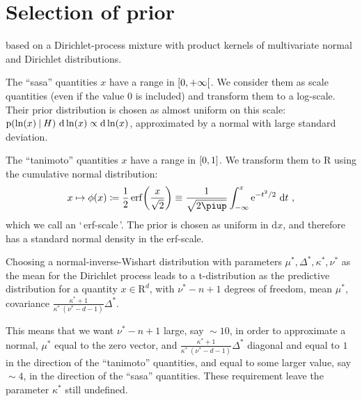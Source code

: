 \documentclass[\ifafour a4paper,12pt,\else a5paper,10pt,\fi%
onecolumn,oneside,article,%
british%
]{memoir}
\newcommand*{\defquote}[1]{`\,#1\,'}
\theoremstyle{remark}
\theoremstyle{innote}
\renewcommand*{\finalnamedelim}{\addspace\amp\space}
\newcommand*{\amp}{\&}
\newcommand*{\pu}{\piup}%
\newcommand*{\e}{\mathrm{e}}%
\newcommand*{\di}{\mathrm{d}}%
\newcommand*{\RR}{\bm{\mathrm{R}}}
\newcommand*{\defd}{\coloneqq}
\DeclarePairedDelimiter\clcl{[}{]}
\DeclarePairedDelimiter\clop{[}{[}
\newcommand*{\p}{\mathrm{p}}%
\renewcommand*{\|}[1][]{\nonscript\:#1\vert\nonscript\:\mathopen{}}
\renewcommand*{\=}{\TextOrMath\texteq\eq}
\begin{document}
\section{Selection of prior}
\label{sec:sel_prior}

based on a Dirichlet-process mixture with
product kernels of multivariate normal and Dirichlet distributions.



The \enquote{sasa} quantities $x$ have a range in $\clop{0,+\infty}$. We
consider them as scale quantities (even if the value $0$ is included) and
transform them to a log-scale. Their prior distribution is chosen as
almost uniform on this scale:
$\p(\ln(x) \| H)\ \di\ln(x) \propto \di\ln(x)$, approximated by a normal
with large standard deviation.

The \enquote{tanimoto} quantities $x$ have a range in $\clcl{0,1}$. We
transform them to $\RR$ using the cumulative normal distribution:
\begin{equation}
  \label{eq:transf_tanimoto}
  x \mapsto \phi(x) \defd
  \frac{1}{2}\operatorname{erf}\biggl(\frac{x}{\sqrt{2}}\biggr)
  \equiv \frac{1}{\sqrt{2\pu}}\int_{-\infty}^{x} \e^{-t^{2}/2}\ \di t \ ,
\end{equation}
which we call an \defquote{erf-scale}.
The prior is chosen as uniform in $\di x$, and therefore has a standard
normal density in the erf-scale.

Choosing a normal-inverse-Wishart distribution with parameters
$\mu^{*}, \varDelta^{*}, \kappa^{*}, \nu^{*}$ as the mean for the Dirichlet
process leads to a t-distribution as the predictive distribution for a
quantity $x \in \RR^{d}$, with $\nu^{*}-n+1$ degrees of freedom, mean
$\mu^{*}$, covariance
$\frac{\kappa^{*}+1}{\kappa^{*}\ (\nu^{*}-d-1)}\varDelta^{*}$.

This means that we want $\nu^{*}-n+1$ large, say ${}\sim 10$, in order to
approximate a normal, $\mu^{*}$ equal to the zero vector, and
$\frac{\kappa^{*}+1}{\kappa^{*}\ (\nu^{*}-d-1)}\varDelta^{*}$ diagonal and
equal to $1$ in the direction of the \enquote{tanimoto} quantities, and
equal to some larger value, say ${}\sim 4$, in the direction of the \enquote{sasa}
quantities. These requirement leave the parameter $\kappa^{*}$ still undefined.



\renewcommand*{\finalnamedelim}{\addcomma\space}

\printbibliography[prenote=prenote%
]
\end{document}
